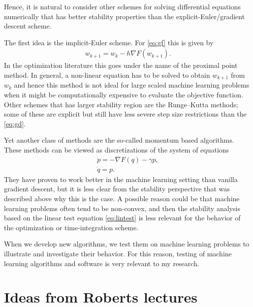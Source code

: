 \documentclass{article}
\begin{document}
Hence, it is natural to consider other schemes for solving differential equations numerically that has better stability properties than the explicit-Euler/gradient descent scheme.

The first idea is the implicit-Euler scheme. For \eqref{eq:gf} this is given by
\begin{align*}
w_{k+1} = w_k - h \nabla F(w_{k+1}).
\end{align*}
In the optimization literature this goes under the name of the proximal point method. 
In general, a non-linear equation has to be solved to obtain $w_{k+1}$ from $w_k$ and hence this method is not ideal for large scaled machine learning problems when it might be computationally expensive to evaluate the objective function.
Other schemes that has larger stability region are the Runge--Kutta methods; some of these are explicit but still have less severe step size restrictions than the \eqref{eq:gd}.

Yet another class of methods are the so-called momentum based algorithms. These methods can be viewed as discretizations of the system of equations
\begin{align*}
\dot{p} = - \nabla F(q) - \gamma p,\\
\dot{q} = p.
\end{align*}
They have proven to work better in the machine learning setting than vanilla gradient descent, but it is less clear from the stability perspective that was described above why this is the case. 
A possible reason could be that machine learning problems often tend to be non-convex, and then the stability analysis based on the linear test equation \eqref{eq:lintest} is less relevant for the behavior of the optimization or time-integration scheme.

When we develop new algorithms, we test them on machine learning problems to illustrate and investigate their behavior. For this reason, testing of machine learning algorithms and software is very relevant to my research.


\section{Ideas from Roberts lectures}

\end{document}
